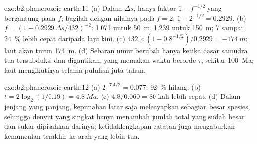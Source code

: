 \begin{solution}{exo:b2:phanerozoic-earth:11}
(a) Dalam $\Delta s$, hanya faktor $1 - f^{-1/2}$ yang bergantung pada $f$; bagilah dengan nilainya pada $f = 2$,
$1 - 2^{-1/2} = 0.2929$. (b) $f = (1 - 0.2929\,\Delta s/432)^{-2}$: 1.071 untuk \qty{50}{m}, 1.239
untuk \qty{150}{m}; 7 sampai \qty{24}{\percent} lebih cepat daripada laju kini. (c) $432 \times (1 -
0.8^{-1/2})/0.2929 = \qty{-174}{m}$: laut akan turun \qty{174}{m}. (d) Sebaran umur
berubah hanya ketika dasar samudra tua tersubduksi dan digantikan, yang memakan waktu berorde $\tau$,
sekitar \qty{100}{Ma}; laut mengikutinya selama puluhan juta tahun.
\end{solution}

\begin{solution}{exo:b2:phanerozoic-earth:12}
(a) $2^{-7.4/2} = 0.077$: \qty{92}{\percent} hilang. (b) $t = 2\log_2(1/0.19) = \qty{4.8}{Ma}$.
(c) $4.8/0.060 = 80$ kali lebih cepat. (d) Dalam jenjang yang panjang, kepunahan latar saja melenyapkan
sebagian besar spesies, sehingga denyut yang singkat hanya menambah jumlah total yang sudah besar dan sukar dipisahkan darinya;
ketidaklengkapan catatan juga mengaburkan kemunculan terakhir ke arah yang lebih tua.
\end{solution}

